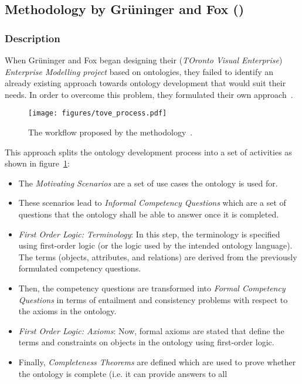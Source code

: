 \subsection{Methodology by Grüninger and Fox ()}
\label{subsec:approach4}

\subsubsection{Description}

When Grüninger and Fox began designing their  (\emph{TOronto Visual Enterprise}) \emph{Enterprise Modelling project} based on ontologies, they failed to identify an already existing approach towards ontology development that would suit their needs. In order to overcome this problem, they formulated their own approach~\cite{GruningerFox}.

\begin{figure}
\centering
\texttt{[image: figures/tove\_process.pdf]}
\caption{The workflow proposed by the  methodology~\cite{GruningerFox}.}
\label{fig:tove_process}
\end{figure}


This approach splits the ontology development process into a set of activities as shown in figure~\ref{fig:tove_process}:

\begin{itemize}
  \item The \emph{Motivating Scenarios} are a set of use cases the ontology is used for.
  \item These scenarios lead to \emph{Informal Competency Questions} which are a set of questions that the ontology shall be able to answer once it is completed.
  \item \emph{First Order Logic: Terminology}: In this step, the terminology is specified using first-order logic (or the logic used by the intended ontology language). The terms (objects, attributes, and relations) are derived from the previously formulated competency questions.
  \item Then, the competency questions are transformed into \emph{Formal Competency Questions} in terms of entailment and consistency problems with respect to the axioms in the ontology.
  \item \emph{First Order Logic: Axioms}: Now, formal axioms are stated that define the terms and constraints on objects in the ontology using first-order logic.
  \item Finally, \emph{Completeness Theorems} are defined which are used to prove whether the ontology is complete (i.e. it can provide answers to all 
\end{itemize}

